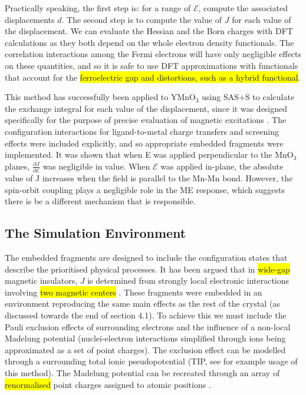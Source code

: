 \documentclass[10pt]{article}
\newcommand{\hilight}[1]{\colorbox{yellow}{#1}}
\begin{document}
Practically speaking, the first step is: for a range of $\mathcal{E}$, compute the associated displacements $d$. The second step is to compute the value of $J$ for each value of the displacement. We can evaluate the Hessian and the Born charges with DFT calculations as they both depend on the whole electron density functionals. The correlation interactions among the Fermi electrons will have only negligible effects on these quantities, and so it is safe to use DFT approximations with functionals that account for the \hilight{ferroelectric gap and distortions, such as a hybrid functional}.

This method has successfully been applied to YMnO$_3$ using SAS+S to calculate the exchange integral for each value of the displacement, since it was designed specifically for the purpose of precise evaluation of magnetic excitations \cite{varignon2013ab}. The configuration interactions for ligand-to-metal charge transfers and screening effects were included explicitly, and so appropriate embedded fragments were implemented. It was shown that when E was applied perpendicular to the MnO$_3$ planes, $\frac{\partial J}{\partial \mathcal{E}}$  was negligible in value. When $\mathcal{E}$ was applied in-plane, the absolute value of J increases when the field is parallel to the Mn-Mn bond. However, the spin-orbit coupling plays a negligible role in the ME response, which suggests there is be a different mechanism that is responsible.

\subsection{The Simulation Environment}
The embedded fragments are designed to include the configuration states that describe the prioritised physical processes. It has been argued that in \hilight{wide-gap} magnetic insulators, $J$ is determined from strongly local electronic interactions involving \hilight{two magnetic centers} \cite{de1999local}. These fragments were embedded in an environment reproducing the same main effects as the rest of the crystal (as discussed towards the end of section 4.1). To achieve this we must include the Pauli exclusion effects of surrounding electrons and the influence of a non-local Madelung potential (nuclei-electron interactions simplified through ions being approximated as a set of point charges). The exclusion effect can be modelled through a surrounding total ionic pseudopotential (TIP, see \cite{winter1987theoretical} for example usage of this method). The Madelung potential can be recreated through an array of \hilight{renormalised} point charges assigned to atomic positions \cite{gelle2008fast}. 
\end{document}
